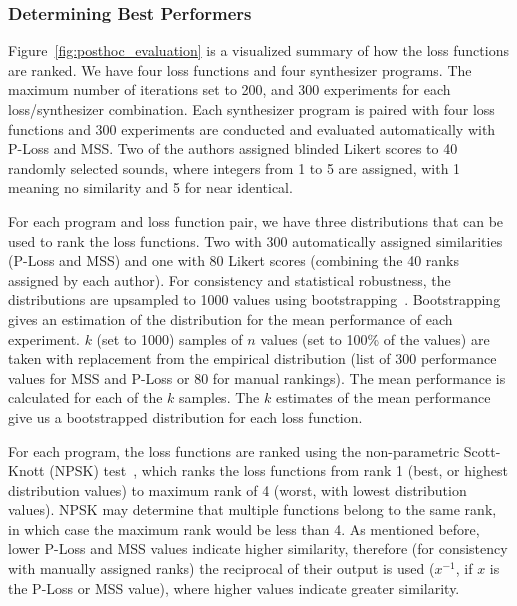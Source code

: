 \documentclass[lettersize,journal]{IEEEtran}
\providecommand{\gls}[1]{#1}
\begin{document}
\subsubsection{Determining Best Performers}
 Figure~\ref{fig:posthoc_evaluation} is a visualized summary of how the loss functions are ranked. We have four loss functions and four synthesizer programs. The maximum number of iterations set to 200, and 300 experiments for each loss/synthesizer combination. Each synthesizer program is paired with four loss functions and 300 experiments are conducted and evaluated automatically with P-Loss and MSS. Two of the authors assigned blinded Likert scores to 40 randomly selected sounds, where integers from 1 to 5 are assigned, with 1 meaning no similarity and 5 for near identical. 

For each program and loss function pair, we have three distributions that can be used to rank the loss functions. Two with 300 automatically assigned similarities (P-Loss and MSS) and one with 80 Likert scores (combining the 40 ranks assigned by each author). For consistency and statistical robustness, the distributions are upsampled to 1000 values using bootstrapping~\cite{tibshirani1993introduction}. Bootstrapping gives an estimation of the distribution for the mean performance of each experiment. $k$ (set to 1000) samples of $n$ values (set to 100\% of the values) are taken with replacement from the empirical distribution (list of 300 performance values for MSS and P-Loss or 80 for manual rankings). The mean performance is calculated for each of the $k$ samples. The $k$ estimates of the mean performance give us a bootstrapped distribution for each loss function. 

For each program, the loss functions are ranked using the non-parametric Scott-Knott (\gls{NPSK}) test~\cite{tantithamthavorn2017mvt,tantithamthavorn2018optimization}, which ranks the loss functions from rank 1 (best, or highest distribution values) to maximum rank of 4 (worst, with lowest distribution values). NPSK may determine that multiple functions belong to the same rank, in which case the maximum rank would be less than 4. As mentioned before, lower P-Loss and MSS values indicate higher similarity, therefore (for consistency with manually assigned ranks) the reciprocal of their output is used ($x^{-1}$, if $x$ is the P-Loss or MSS value), where higher values indicate greater similarity. 


\end{document}

